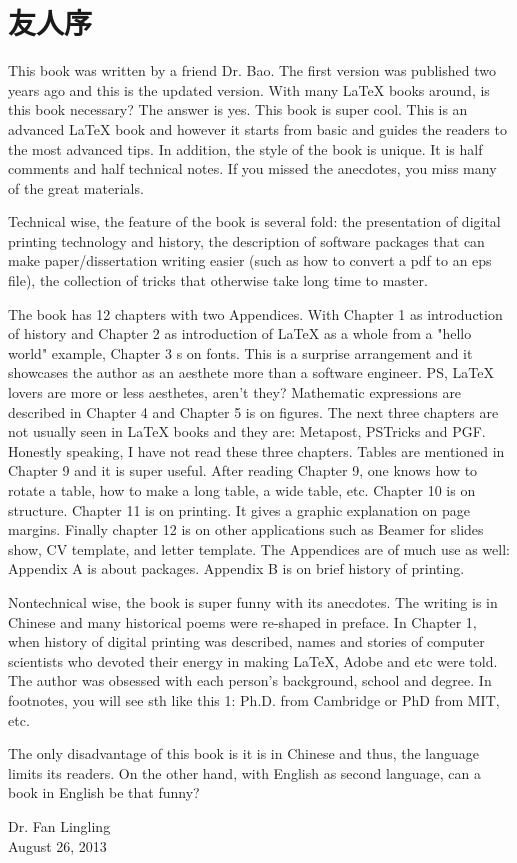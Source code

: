 \chapter{友人序}

This book was written by a friend Dr. Bao. The first version was published two years ago and this is the updated version. With many \LaTeX{} books around, is this book necessary? The answer is yes. This book is super cool. This is an advanced \LaTeX{} book and however it starts from basic and guides the readers to the most advanced tips. In addition, the style of the book is unique. It is half comments and half technical notes. If you missed the anecdotes, you miss many of the great materials.

Technical wise, the feature of the book is several fold: the presentation of digital printing technology and history, the description of software packages that can make paper/dissertation writing easier (such as how to convert a pdf to an eps file), the collection of tricks that otherwise take long time to master.

The book has 12 chapters with two Appendices. With Chapter 1 as introduction of history and Chapter 2 as introduction of \LaTeX{} as a whole from a "hello world" example, Chapter 3 s on fonts. This is a surprise arrangement and it showcases the author as an aesthete more than a software engineer. PS, \LaTeX{} lovers are more or less aesthetes, aren't they? Mathematic expressions are described in Chapter 4 and Chapter 5 is on figures. The next three chapters are not usually seen in \LaTeX{} books and they are: Metapost, PSTricks and PGF. Honestly speaking, I have not read these three chapters. Tables are mentioned in Chapter 9 and it is super useful. After reading Chapter 9, one knows how to rotate a table, how to make a long table, a wide table, etc. Chapter 10 is on structure. Chapter 11 is on printing. It gives a graphic explanation on page margins. Finally chapter 12 is on other applications such as Beamer for slides show, CV template, and letter template. The Appendices are of much use as well: Appendix A is about packages. Appendix B is on brief history of printing.

Nontechnical wise, the book is super funny with its anecdotes. The writing is in Chinese and many historical poems were re-shaped in preface. In Chapter 1, when history of digital printing was described, names and stories of computer scientists who devoted their energy in making \LaTeX{}, Adobe and etc were told. The author was obsessed with each person's background, school and degree. In footnotes, you will see sth like this 1: Ph.D. from Cambridge or PhD from MIT, etc.

The only disadvantage of this book is it is in Chinese and thus, the language limits its readers. On the other hand, with English as second language, can a book in English be that funny?

\begin{flushright}
Dr. Fan Lingling \\
August 26, 2013
\end{flushright}
